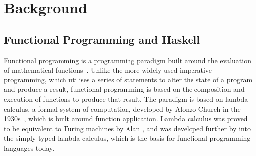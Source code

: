 \documentclass[../main.tex]{subfiles}
\begin{document}
\chapter{Background}






    \section{Functional Programming and Haskell}
        Functional programming is a programming paradigm built around the evaluation of
            mathematical functions~\citep{fpPaulHudak}.
        Unlike the more widely used imperative programming, which utilises a series of
            statements to alter the state of a program and produce a result, functional
            programming is based on the composition and execution of functions to produce
            that result.
        The paradigm is based on lambda calculus, a formal system of computation,
            developed by Alonzo Church in the 1930s~\citep{lambdaCalculus}, which is built
            around function application.
        Lambda calculus was proved to be equivalent to Turing machines by Alan
            \citet{lambdaTuringComplete}, and was developed further by
            \citet{simplyTypedLambdaCalculus} into the simply typed lambda calculus, which
            is the basis for functional programming languages today.
\end{document}
